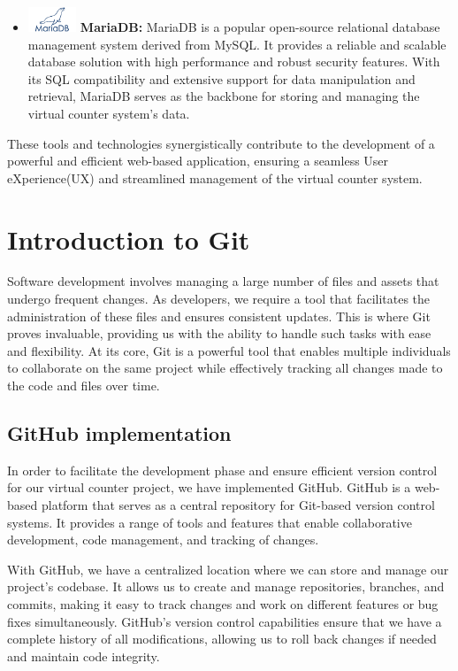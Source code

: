 \begin{itemize}
  \item \includegraphics[height=2em]{MariaDB_Logo.d8a208f0a889a8f0f0551b8391a065ea79c54f3a.png} \textbf{MariaDB:}  MariaDB is a popular open-source relational database management system derived from MySQL. It provides a reliable and scalable database solution with high performance and robust security features. With its SQL compatibility and extensive support for data manipulation and retrieval, MariaDB serves as the backbone for storing and managing the virtual counter system's data.
\end{itemize}

These tools and technologies synergistically contribute to the development of a powerful and efficient web-based application, ensuring a seamless User eXperience(UX) and streamlined management of the virtual counter system.

\section{Introduction to Git }
Software development involves managing a large number of files and assets that undergo frequent changes. As developers, we require a tool that facilitates the administration of these files and ensures consistent updates. This is where Git proves invaluable, providing us with the ability to handle such tasks with ease and flexibility. At its core, Git is a powerful tool that enables multiple individuals to collaborate on the same project while effectively tracking all changes made to the code and files over time.
\subsection{GitHub implementation}
In order to facilitate the development phase and ensure efficient version control for our virtual counter project, we have implemented GitHub. GitHub is a web-based platform that serves as a central repository for Git-based version control systems. It provides a range of tools and features that enable collaborative development, code management, and tracking of changes.

With GitHub, we have a centralized location where we can store and manage our project's codebase. It allows us to create and manage repositories, branches, and commits, making it easy to track changes and work on different features or bug fixes simultaneously. GitHub's version control capabilities ensure that we have a complete history of all modifications, allowing us to roll back changes if needed and maintain code integrity.

